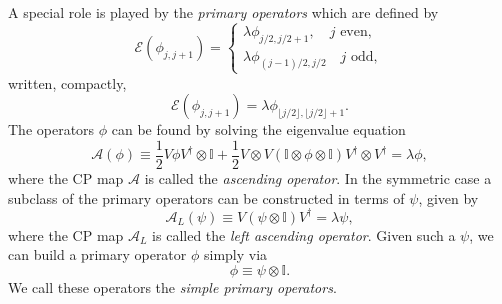 \documentclass[prl,twocolumn,lengthcheck,superscriptaddress]{revtex4-1}
\theoremstyle{definition}
\theoremstyle{remark}
\begin{document}
A special role is played by the \emph{primary operators} which are defined by
\begin{equation}
	\mathcal{E}(\phi_{j,j+1}) = \begin{cases} \lambda \phi_{j/2, j/2+1}, \quad \text{$j$ even}, \\ \lambda \phi_{(j-1)/2,j/2} \quad \text{$j$ odd},\end{cases} 
\end{equation}
written, compactly, 
\begin{equation}
	\mathcal{E}(\phi_{j,j+1}) = \lambda \phi_{\lfloor j/2 \rfloor, \lfloor j/2 \rfloor+1}.
\end{equation}
The operators $\phi$ can be found by solving the eigenvalue equation
\begin{equation}\label{eq:ttntx}
	\mathcal{A}(\phi) \equiv \frac{1}{2}V \phi V^\dag\otimes \mathbb{I} + \frac12V\otimes V(\mathbb{I}\otimes\phi\otimes \mathbb{I}) V^\dag\otimes V^\dag =    \lambda\phi,
\end{equation} 
where the CP map $\mathcal{A}$ is called the \emph{ascending operator}. In the symmetric case a subclass of the primary operators can be constructed in terms of $\psi$, given by
\begin{equation}
	\mathcal{A}_L(\psi) \equiv V(\psi\otimes \mathbb{I})V^\dag = \lambda \psi,
\end{equation}
where the CP map $\mathcal{A}_L$ is called the \emph{left ascending operator}. 
Given such a $\psi$, we can build a primary operator $\phi$ simply via
\begin{equation}
	\phi \equiv \psi\otimes \mathbb{I}.
\end{equation}
We call these operators the \emph{simple primary operators}.
\end{document}
